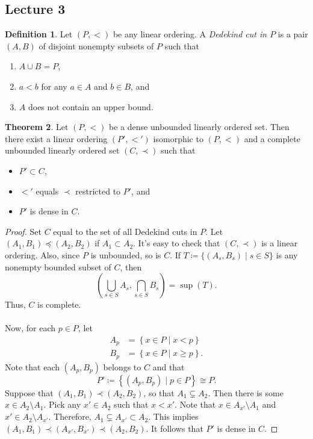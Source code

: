 \documentclass[10pt,letterpaper,cm]{nupset}
\theoremstyle{definition}
\newtheorem{definition}{Definition}[subsection]
\theoremstyle{theorem}
\newtheorem{theorem}[definition]{Theorem}
\theoremstyle{remark}
\newcommand{\1}{\mathbf{1}}
\newcommand{\0}{\vec 0}
\begin{document}
\subsection{Lecture 3}

\begin{definition}
Let  $(P, <)$ be any linear ordering. A \textit{Dedekind cut in $P$} is a pair $(A, B)$ of disjoint nonempty subsets of $P$ such that
\begin{enumerate}[label=(\roman*)]
\item $A \cup B = P$,
\item $a<b$ for any $a\in A$ and $b \in B$, and
\item $A$ does not contain an upper bound.
\end{enumerate}
\end{definition}

\begin{theorem}
Let $(P, <)$ be a dense unbounded linearly ordered set. Then there exist a linear ordering $(P', <')$ isomorphic to $(P, <)$ and a complete unbounded linearly ordered set $(C, \prec)$ such that
\begin{itemize}
\item $P' \subset C$,
\item $<'$ equals $\prec$ restricted to $P'$, and
\item $P'$ is dense in $C$.
\end{itemize}
\end{theorem}
\begin{proof}
Set $C$ equal to the set of all Dedekind cuts in $P$. Let $(A_1, B_1)\preceq (A_2, B_2)$ if $A_1\subset A_2$. It's easy to check that $(C, \prec)$ is  a linear ordering. Also, since $P$ is unbounded, so is $C$. If $T\coloneqq \{(A_s, B_s) \mid s\in S\}$ is any nonempty bounded subset of $C$, then $$\left(\bigcup_{s\in S} A_s, \bigcap_{s\in S} B_s\right) = \sup(T).$$ Thus, $C$ is complete. 
\\ \\
Now, for each $p\in P$, let 
\begin{align*}
A_p & = \left\{x\in P \mid x<p\right\}
\\ B_p & = \left\{x\in P \mid x\geq p\right\}.
\end{align*}
Note that each $(A_p, B_p)$ belongs to $C$ and that $$P' \coloneqq \left\{(A_p, B_p) \mid p\in P\right\} \cong P.$$ Suppose that $(A_1, B_1) \prec (A_2, B_2)$, so that $A_1 \subsetneq A_2$. Then there is some $x\in A_2 \setminus A_1$. Pick any $x' \in A_2$ such that $x<x'$. Note that $x\in A_{x'} \setminus A_1$ and $x'\in A_2\setminus A_{x'}$. Therefore, $A_1 \subsetneq A_{x'} \subset A_2$. This implies $(A_1, B_1) \prec (A_{x'}, B_{x'}) \prec (A_2, B_2)$. It follows that $P'$ is dense in $C$. 
\end{proof}
\end{document}
